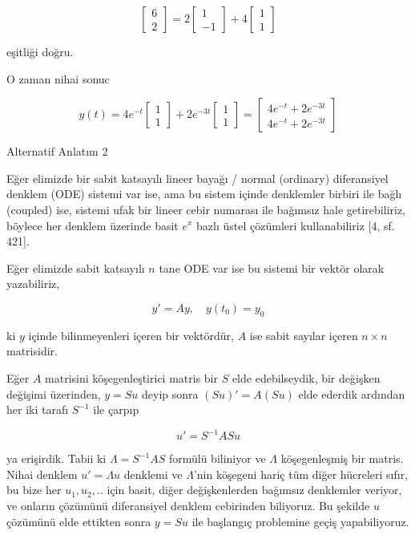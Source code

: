 \documentclass[12pt,fleqn]{article}\usepackage{../../common}
\begin{document}
$$
\left[\begin{array}{r}
6 \\ 2
\end{array}\right] =
2 
\left[\begin{array}{r}
1 \\ -1
\end{array}\right] +
4 
\left[\begin{array}{r}
1 \\ 1
\end{array}\right] 
$$

eşitliği doğru. 

O zaman nihai sonuc

$$
y(t) =
4 e^{-t}
\left[\begin{array}{r}
1 \\ 1
\end{array}\right]  +
2 e^{-3t}
\left[\begin{array}{r}
1 \\ 1
\end{array}\right] =
\left[\begin{array}{r}
4 e^{-t} + 2 e^{-3t} \\
4 e^{-t} + 2 e^{-3t}
\end{array}\right]
$$


Alternatif Anlatım 2

Eğer elimizde bir sabit katsayılı lineer bayağı / normal (ordinary) diferansiyel
denklem (ODE) sistemi var ise, ama bu sistem içinde denklemler birbiri ile bağlı
(coupled) ise, sistemi ufak bir lineer cebir numarası ile bağımsız hale
getirebiliriz, böylece her denklem üzerinde basit $e^x$ bazlı üstel çözümleri
kullanabiliriz [4, sf. 421].

Eğer elimizde sabit katsayılı $n$ tane ODE var ise bu sistemi bir vektör
olarak yazabiliriz,

$$
y' = A y, \quad y(t_0) = y_0
$$

ki $y$ içinde bilinmeyenleri içeren bir vektördür, $A$ ise sabit sayılar
içeren $n \times n$ matrisidir.

Eğer $A$ matrisini köşegenleştirici matris bir $S$ elde edebilseydik, bir
değişken değişimi üzerinden, $y = Su$ deyip sonra $(Su)' = A(Su)$ elde
ederdik ardından her iki tarafı $S^{-1}$ ile çarpıp

$$
u' = S^{-1} A S u
$$

ya erişirdik. Tabii ki $\Lambda = S^{-1} A S$ formülü biliniyor ve $\Lambda$
köşegenleşmiş bir matris. Nihai denklem $u' = \Lambda u$ denklemi ve
$\Lambda$'nin köşegeni hariç tüm diğer hücreleri sıfır, bu bize her $u_1,u_2,..$
için basit, diğer değişkenlerden bağımsız denklemler veriyor, ve onların
çözümünü diferansiyel denklem cebirinden biliyoruz. Bu şekilde $u$ çözümünü
elde ettikten sonra $y = S u$ ile başlangıç problemine geçiş yapabiliyoruz. 
\end{document}
